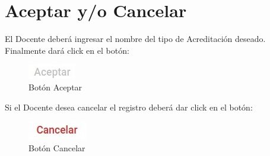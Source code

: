 \pagebreak
\hypertarget{AceptarCancelar}{\section{Aceptar y/o Cancelar}}
El Docente deberá ingresar el nombre del tipo de Acreditación deseado. Finalmente dará click en el botón:

\begin{figure}[H]
    \centering
    \includegraphics[width=0.1\linewidth]{images/SP6/BotonAceptar.jpeg}
    \caption{Botón Aceptar}
\end{figure}

Si el Docente desea cancelar el registro deberá dar click en el botón:

\begin{figure}[H]
    \centering
    \includegraphics[width=0.1\linewidth]{images/SP6/BotonCancelar.jpeg}
    \caption{Botón Cancelar}
\end{figure}